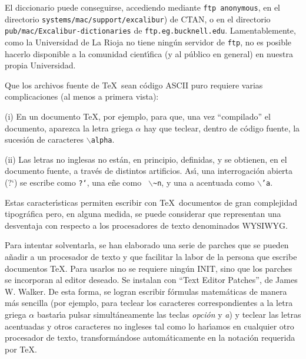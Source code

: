El diccionario puede conseguirse, accediendo mediante {\tt ftp anonymous}, en
el directorio {\tt systems/mac/support/excalibur}) de CTAN, o en el directorio
{\tt pub/mac/Excalibur-dictionaries} de {\tt ftp.eg.bucknell.edu}.
Lamentablemente, como la Universidad de La Rioja no tiene ning\'un servidor de
{\tt ftp}, no es posible hacerlo disponible a la comunidad cient\'{\i}fica (y
al p\'ublico en general) en nuestra propia Universidad.



Que los archivos fuente de \TeX\ sean c\'odigo ASCII puro requiere varias
complicaciones (al menos a primera vista):

\item{(i)}
En un documento \TeX, por ejemplo, para que, una vez ``compilado'' el
documento, aparezca la letra griega $\alpha$ hay que teclear, dentro de
c\'odigo fuente, la sucesi\'on de caracteres {\tt $\backslash$alpha}.

\item{(ii)}
Las letras no inglesas no est\'an, en principio, definidas, y se obtienen, en
el documento fuente, a trav\'es de distintos artificios. As\'{\i}, una
interrogaci\'on abierta (?`) se escribe como {\tt ?{}`}, una e\~ne como {\tt
$\backslash$\~{}n}, y una a acentuada como {\tt $\backslash$'{}a}.

Estas caracter\'{\i}sticas permiten escribir con \TeX\ documentos de gran
complejidad tipogr\'afica pero, en alguna medida, se puede considerar que
representan una desventaja con respecto a los procesadores de texto
denominados WYSIWYG.

Para intentar solventarla, se han elaborado una serie de parches que se pueden
a\~nadir a un procesador de texto y que facilitar la labor de la persona que
escribe documentos \TeX. Para usarlos no se requiere ning\'un INIT, sino que
los parches se incorporan al editor deseado. Se instalan con ``Text Editor
Patches'', de James W. Walker. De esta forma, se logran escribir f\'ormulas
matem\'aticas de manera m\'as sencilla (por ejemplo, para teclear los
caracteres correspondientes a la letra griega $\alpha$ bastar\'{\i}a pulsar
simult\'aneamente las teclas {\it opci\'on\/} y {\it a\/}) y teclear las letras
acentuadas y otros caracteres no ingleses tal como lo har\'{\i}amos en
cualquier otro procesador de texto, transform\'andose autom\'aticamente en la
notaci\'on requerida por \TeX.

